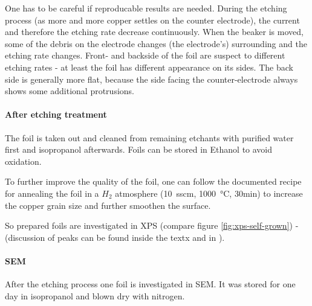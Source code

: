 One has to be careful if reproducable results are needed. During the etching process (as more and more copper settles on the counter electrode), the current and therefore the etching rate decrease continuously. When the beaker is moved, some of the debris on the electrode changes (the electrode's) surrounding and the etching rate changes. Front- and backside of the foil are suspect to different etching rates - at least the foil has different appearance on its sides. The back side is generally more flat, because the side facing the counter-electrode always shows some additional protrusions.

\paragraph{After etching treatment}
The foil is taken out and cleaned from remaining etchants with purified water first and isopropanol afterwards. Foils can be stored in Ethanol to avoid oxidation. 

To further improve the quality of the foil, one can follow the documented recipe for annealing the foil in a $H_2$ atmosphere (\SI{10}{sscm}, \SI{1000}{\celsius}, 30min)\cite{kim_synthesis_2012} to increase the copper grain size and further smoothen the surface. 

So prepared foils are investigated in XPS (compare figure \ref{fig:xps-self-grown}) - (discussion of peaks can be found inside the textx and in \cite[8]{stables_report_2008}).

\paragraph{SEM}
After the etching process one foil is investigated in SEM. It was stored for one day in isopropanol and blown dry with nitrogen. 


	 
